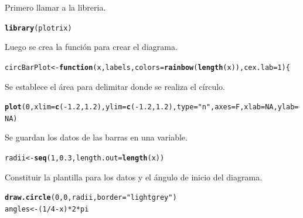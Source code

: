 \documentclass{article}\usepackage[]{graphicx}\usepackage[]{color}
\makeatletter
\newcommand{\hlnum}[1]{\textcolor[rgb]{0.686,0.059,0.569}{#1}}%
\newcommand{\hlstr}[1]{\textcolor[rgb]{0.192,0.494,0.8}{#1}}%
\newcommand{\hlopt}[1]{\textcolor[rgb]{0,0,0}{#1}}%
\newcommand{\hlstd}[1]{\textcolor[rgb]{0.345,0.345,0.345}{#1}}%
\newcommand{\hlkwb}[1]{\textcolor[rgb]{0.69,0.353,0.396}{#1}}%
\newcommand{\hlkwc}[1]{\textcolor[rgb]{0.333,0.667,0.333}{#1}}%
\newcommand{\hlkwd}[1]{\textcolor[rgb]{0.737,0.353,0.396}{\textbf{#1}}}%
\newenvironment{kframe}{%
 \def\at@end@of@kframe{}%
 \ifinner\ifhmode%
  \def\at@end@of@kframe{\end{minipage}}%
  \begin{minipage}{\columnwidth}%
 \fi\fi%
 \def\FrameCommand##1{\hskip\@totalleftmargin \hskip-\fboxsep
 \colorbox{shadecolor}{##1}\hskip-\fboxsep
     \hskip-\linewidth \hskip-\@totalleftmargin \hskip\columnwidth}%
 \MakeFramed {\advance\hsize-\width
   \@totalleftmargin\z@ \linewidth\hsize
   \@setminipage}}%
 {\par\unskip\endMakeFramed%
 \at@end@of@kframe}
\newenvironment{knitrout}{}{} %
\makeatother
\begin{document}
Primero llamar a la libreria.
\begin{knitrout}
\color{fgcolor}\begin{kframe}
\begin{alltt}
\hlkwd{library}\hlstd{(plotrix)}
\end{alltt}
\end{kframe}
\end{knitrout}
Luego se crea la funci\'on para crear el diagrama.
\begin{knitrout}
\color{fgcolor}\begin{kframe}
\begin{alltt}
circBarPlot <- \hlkwd{function}(x, labels, colors=\hlkwd{rainbow}(\hlkwd{length}(x)), cex.lab=1) \{
\end{alltt}
\end{kframe}
\end{knitrout}
Se establece el \'area para delimitar donde se realiza el c\'irculo.
\begin{knitrout}
\color{fgcolor}\begin{kframe}
\begin{alltt}
  \hlkwd{plot}\hlstd{(}\hlnum{0}\hlstd{,}\hlkwc{xlim}\hlstd{=}\hlkwd{c}\hlstd{(}\hlopt{-}\hlnum{1.2}\hlstd{,}\hlnum{1.2}\hlstd{),}\hlkwc{ylim}\hlstd{=}\hlkwd{c}\hlstd{(}\hlopt{-}\hlnum{1.2}\hlstd{,}\hlnum{1.2}\hlstd{),}\hlkwc{type}\hlstd{=}\hlstr{"n"}\hlstd{,}\hlkwc{axes}\hlstd{=F,} \hlkwc{xlab}\hlstd{=}\hlnum{NA}\hlstd{,} \hlkwc{ylab}\hlstd{=}\hlnum{NA}\hlstd{)}
\end{alltt}
\end{kframe}
\end{knitrout}
Se guardan los datos de las barras en una variable.
\begin{knitrout}
\color{fgcolor}\begin{kframe}
\begin{alltt}
  \hlstd{radii} \hlkwb{<-} \hlkwd{seq}\hlstd{(}\hlnum{1}\hlstd{,} \hlnum{0.3}\hlstd{,} \hlkwc{length.out}\hlstd{=}\hlkwd{length}\hlstd{(x))}
\end{alltt}
\end{kframe}
\end{knitrout}
Constituir la plantilla para los datos y el \'angulo de inicio del diagrama.
\begin{knitrout}
\color{fgcolor}\begin{kframe}
\begin{alltt}
  \hlkwd{draw.circle}\hlstd{(}\hlnum{0}\hlstd{,}\hlnum{0}\hlstd{,radii,}\hlkwc{border}\hlstd{=}\hlstr{"lightgrey"}\hlstd{)}
  \hlstd{angles} \hlkwb{<-} \hlstd{(}\hlnum{1}\hlopt{/}\hlnum{4} \hlopt{-} \hlstd{x)}\hlopt{*}\hlnum{2}\hlopt{*}\hlstd{pi}
\end{alltt}
\end{kframe}
\end{knitrout}
\end{document}

